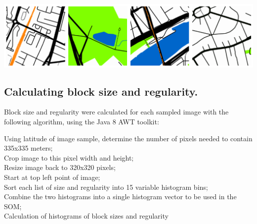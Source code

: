 \documentclass{nature}
\makeatletter
\renewenvironment*{figure}{\@float{figure}}{\end@float}
\makeatother
\begin{document}
\begin{methods}
\begin{figure}
    \centering    
 \includegraphics[scale=0.8]{Images/SampleTraining.png}   
\caption{\bf Four sample Google Maps training data images (from Paris, France)\cite{GoogleStatic2017}.}    
 \label{fig:maps}  
\end{figure} 


\subsection{Calculating block size and regularity.}\label{methodscalc}

Block size and regularity were calculated for each sampled image with the following algorithm, using the Java 8 AWT toolkit\cite{Oracle2018}:

\begin{algorithm}[H]
\SetAlgoLined
{}
 Using latitude of image sample, determine the number of pixels needed to contain 335x335 meters;\\
 Crop image to this pixel width and height;\\
 Resize image back to 320x320 pixels;\\
 Start at top left point of image;\\
 Sort each list of size and regularity into 15 variable histogram bins;\\
 Combine the two histograms into a single histogram vector to be used in the SOM;\\
 \caption{Calculation of histograms of block sizes and regularity}
\end{algorithm}


\end{methods}
\end{document}
